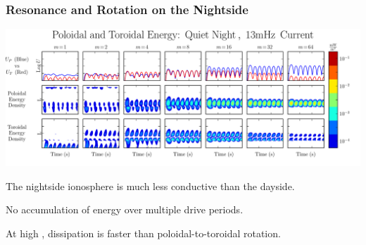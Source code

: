 \documentclass{beamer}
\begin{document}

\begin{frame}
\frametitle{Resonance and Rotation on the Nightside}

\vfill

\includegraphics[width=\textwidth]{figures/energy_night.pdf}

\begin{wideitemize}
\item The nightside ionosphere is much less conductive than the dayside. 
\item No accumulation of energy over multiple drive periods. 
\item At high \azm, dissipation is faster than poloidal-to-toroidal rotation. 
\end{wideitemize}

\end{frame}

\end{document}
